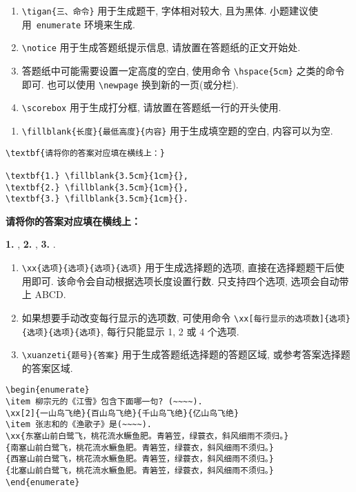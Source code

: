 \documentclass{hfutexam}
\begin{document}
\begin{enumerate}
\item \lstinline|\tigan{三、命令}| 用于生成题干, 字体相对较大, 且为黑体. 小题建议使用~{\color{blue}\lstinline|enumerate|} 环境来生成.
\item \lstinline|\notice| 用于生成答题纸提示信息, 请放置在答题纸的正文开始处.
\item 答题纸中可能需要设置一定高度的空白, 使用命令 \lstinline|\hspace{5cm}| 之类的命令即可. 也可以使用 \lstinline|\newpage| 换到新的一页(或分栏).
\item \scorebox\lstinline|\scorebox| 用于生成打分框, 请放置在答题纸一行的开头使用.
\end{enumerate}

\begin{enumerate}
\item \lstinline|\fillblank{长度}{最低高度}{内容}| 用于生成填空题的空白, 内容可以为空.
\end{enumerate}

\textit{\color{blue}{示例:}}
\begin{lstlisting}
\textbf{请将你的答案对应填在横线上：}

\textbf{1.} \fillblank{3.5cm}{1cm}{}, 
\textbf{2.} \fillblank{3.5cm}{1cm}{}, 
\textbf{3.} \fillblank{3.5cm}{1cm}{}.
\end{lstlisting}
\textbf{请将你的答案对应填在横线上：}

\textbf{1.} \fillblank{3.5cm}{1cm}{}, 
\textbf{2.} \fillblank{3.5cm}{1cm}{}, 
\textbf{3.} \fillblank{3.5cm}{1cm}{}.


\begin{enumerate}
\item \lstinline|\xx{选项}{选项}{选项}{选项}| 用于生成选择题的选项, 直接在选择题题干后使用即可. 该命令会自动根据选项长度设置行数. 只支持四个选项, 选项会自动带上 ABCD.
\item 如果想要手动改变每行显示的选项数, 可使用命令 \lstinline|\xx[每行显示的选项数]{选项}{选项}{选项}{选项}|, 每行只能显示 1, 2 或 4 个选项.
\item \lstinline|\xuanzeti{题号}{答案}| 用于生成答题纸选择题的答题区域, 或参考答案选择题的答案区域.
\end{enumerate}

\textit{\color{blue}{示例:}}
\begin{lstlisting}
\begin{enumerate}
\item 柳宗元的《江雪》包含下面哪一句? (~~~~).
\xx[2]{一山鸟飞绝}{百山鸟飞绝}{千山鸟飞绝}{亿山鸟飞绝}
\item 张志和的《渔歌子》是(~~~~).
\xx{东塞山前白鹭飞，桃花流水鳜鱼肥。青箬笠，绿蓑衣，斜风细雨不须归。}
{南塞山前白鹭飞，桃花流水鳜鱼肥。青箬笠，绿蓑衣，斜风细雨不须归。}
{西塞山前白鹭飞，桃花流水鳜鱼肥。青箬笠，绿蓑衣，斜风细雨不须归。}
{北塞山前白鹭飞，桃花流水鳜鱼肥。青箬笠，绿蓑衣，斜风细雨不须归。}
\end{enumerate}
\end{lstlisting}
\end{document}
